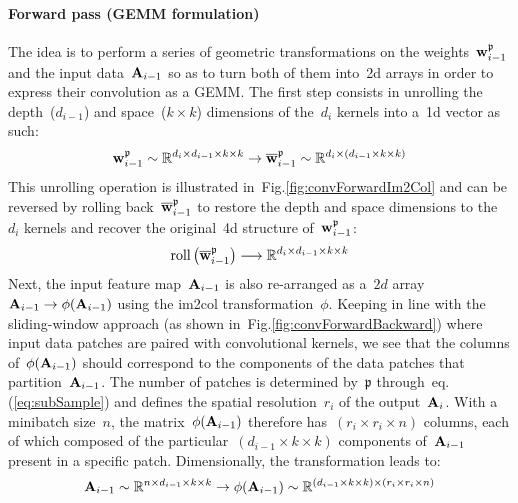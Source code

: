 \documentclass{article}
\begin{document}
\paragraph{Forward pass (GEMM formulation)}  The idea is to perform a series of geometric transformations on the weights~${\bf w}_{i-1}^\mathfrak{p}$ and the input data~${\bf A}_{i-1}$ so as to turn both of them into~2d arrays in order to express their convolution as a GEMM. The first step consists in unrolling the depth~($d_{i-1}$) and space~($k\times k$) dimensions of the~$d_i$ kernels into a~1d vector as such:
\begin{equation}
{\bf w}^{\mathfrak{p}}_{i-1} \sim \mathbb{R}^{d_i \times d_{i-1} \times k \times k} \rightarrow \overline{{\bf w}}^{\mathfrak{p}}_{i-1} \sim \mathbb{R}^{d_i \times (d_{i-1} \times k \times k)}
\label{kernelUnroll}
\end{equation}
This unrolling operation is illustrated in~Fig.\ref{fig:convForwardIm2Col} and can be reversed by rolling back~$\overline{{\bf w}}^{\mathfrak{p}}_{i-1}$ to restore the depth and space dimensions to the~$d_i$ kernels and recover the original~4d structure of~${\bf w}^{\mathfrak{p}}_{i-1}$:
\begin{equation}
\text{roll} \left( \overline{{\bf w}}^{\mathfrak{p}}_{i-1} \right) \longrightarrow \mathbb{R}^{d_i \times d_{i-1} \times k \times k}
\label{kernelRoll}
\end{equation}
Next, the input feature map~${\bf A}_{i-1}$ is also re-arranged as a~$2d$ array~${\bf A}_{i-1} \rightarrow \phi({\bf A}_{i-1})$ using the im2col transformation~$\phi$. Keeping in line with the sliding-window approach (as shown in~Fig.\ref{fig:convForwardBackward}) where input data patches are paired with convolutional kernels, we see that the columns of~$\phi({\bf A}_{i-1})$ should correspond to the components of the data patches that partition~${\bf A}_{i-1}$.  The number of patches is determined by~$\mathfrak{p}$ through~eq.(\ref{eq:subSample}) and defines the spatial resolution~$r_i$ of the output~${\bf A}_i$.  With a minibatch size~$n$, the matrix~$\phi({\bf A}_{i-1})$ therefore has~$(r_i \times r_i \times n)$ columns, each of which composed of the particular~$(d_{i-1} \times k\times k)$ components of~${\bf A}_{i-1}$ present in a specific patch.  Dimensionally, the transformation leads to:
\begin{equation*}
{\bf A}_{i-1} \sim \mathbb{R}^{n\times d_{i-1} \times k \times k} \rightarrow \phi({\bf A}_{i-1}) \sim \mathbb{R}^{(d_{i-1}\times k\times k) \times (r_i \times r_i \times n)}
\end{equation*}
\end{document}
